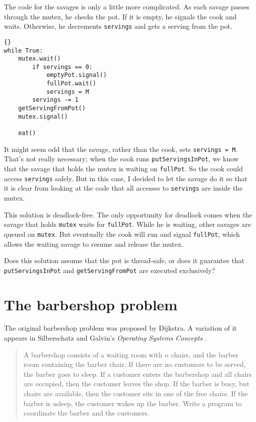 \documentclass{book}
\newcommand{\clearemptydoublepage}{\newpage\cleardoublepage}
\begin{document}
The code for the savages is only a little more complicated.
As each savage passes through the mutex, he checks the pot.
If it is empty, he signals the cook and waits.  Otherwise,
he decrements {\tt servings} and gets a serving from the pot.

\begin{lstlisting}[title={Dining Savages solution (savage)}]{}
while True:
    mutex.wait()
        if servings == 0:
            emptyPot.signal()
            fullPot.wait()
            servings = M
        servings -= 1
	getServingFromPot()
    mutex.signal()

    eat()
\end{lstlisting}

It might seem odd that the savage, rather than the cook, sets
{\tt servings = M}.  That's not really necessary; when the cook
runs {\tt putServingsInPot}, we know that the savage that holds
the mutex is waiting on {\tt fullPot}.  So the cook could
access {\tt servings} safely.  But in this case, I decided to
let the savage do it so that it is clear from looking at the
code that all accesses to {\tt servings} are inside the mutex.

This solution is deadlock-free.  The only opportunity for
deadlock comes when the savage that holds {\tt mutex} waits
for {\tt fullPot}.  While he is waiting, other savages are
queued on {\tt mutex}.  But eventually the cook will run and
signal {\tt fullPot}, which allows the waiting savage
to resume and release the mutex.

Does this solution assume that the pot is thread-safe, or does it
guarantee that {\tt putServingsInPot} and {\tt getServingFromPot}
are executed exclusively?


\clearemptydoublepage
\section{The barbershop problem}

The original barbershop problem was proposed by
Dijkstra.  A variation of it appears in 
Silberschatz and Galvin's {\em Operating Systems Concepts}
\cite{silberschatz}.

\begin {quotation}
A barbershop consists of a waiting room with $n$ chairs, and the
barber room containing the barber chair.  If there are no customers to
be served, the barber goes to sleep.  If a customer enters the
barbershop and all chairs are occupied, then the customer leaves the
shop.  If the barber is busy, but chairs are available, then the
customer sits in one of the free chairs.  If the barber is asleep, the
customer wakes up the barber.  Write a program to coordinate the
barber and the customers.
\end{quotation}
\end{document}
